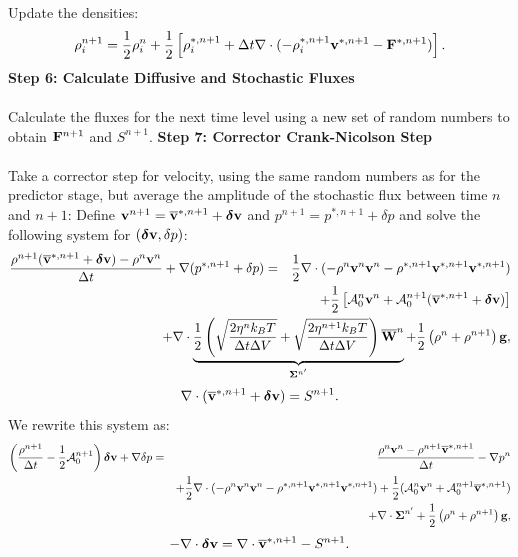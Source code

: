 \documentclass[final]{siamltex}
\def\Fb {{\bf F}}
\def\gb {{\bf g}}
\def\vb {{\bf v}}
\def\Wb {{\bf W}}
\def\deltab {\boldsymbol{\delta}}
\def\Sigmab {\boldsymbol{\Sigma}}
\def\half   {\frac{1}{2}}
\begin{document}
Update the densities:
\begin{equation}
\rho_i^{n+1} = \half\rho_i^n + \half\left[\rho_i^{*,n+1} + \Delta t\nabla\cdot(-\rho_i^{*,n+1}\vb^{*,n+1} - \Fb^{*,n+1})\right].
\end{equation}
{\bf Step 6: Calculate Diffusive and Stochastic Fluxes}\\ \\
Calculate the fluxes for the next time level using a new set of random numbers to obtain $\Fb^{n+1}$ and $S^{n+1}$.
{\bf Step 7: Corrector Crank-Nicolson Step}\\ \\
Take a corrector step for velocity, using the same random numbers as for the predictor
stage, but average the amplitude of the stochastic flux between time $n$ and $n+1$:
Define $\vb^{n+1} = \overline\vb^{*,n+1} + \deltab\vb$ and $p^{n+1} = p^{*,n+1} + \delta p$ and
solve the following system for $(\deltab\vb,\delta p)$:
\begin{eqnarray}
\frac{\rho^{n+1}(\overline\vb^{*,n+1} + \deltab\vb) - \rho^n\vb^n}{\Delta t} + \nabla(p^{*,n+1}+\delta p) &=& \half\nabla\cdot(-\rho^n\vb^n\vb^n - \rho^{*,n+1}\vb^{*,n+1}\vb^{*,n+1})\nonumber\\
&&\hspace{-1.5in}+ \half\left[\mathcal{A}_0^n\vb^n + \mathcal{A}_0^{n+1}(\overline\vb^{*,n+1} + \deltab\vb)\right]\nonumber\\
&&\hspace{-1.5in}+ \nabla\cdot\underbrace{\half\left(\sqrt{\frac{2\eta^n k_B T}{\Delta t\Delta V}} + \sqrt{\frac{2\eta^{n+1} k_B T}{\Delta t\Delta V}}\right)\overline\Wb^n}_{\Sigmab^{n'}} + \half\left(\rho^n+\rho^{n+1}\right)\gb,
\end{eqnarray}
\begin{equation}
\nabla\cdot(\overline\vb^{*,n+1} + \deltab\vb) = S^{n+1}.
\end{equation}
We rewrite this system as:
\begin{eqnarray}
\left(\frac{\rho^{n+1}}{\Delta t} - \half\mathcal{A}_0^{n+1}\right)\deltab\vb + \nabla\delta p &=& \frac{\rho^n\vb^n-\rho^{n+1}\overline\vb^{*,n+1}}{\Delta t} -\nabla p^n\nonumber\\
&&+ \half\nabla\cdot(-\rho^n\vb^n\vb^n - \rho^{*,n+1}\vb^{*,n+1}\vb^{*,n+1}) + \half(\mathcal{A}_0^n\vb^n + \mathcal{A}_0^{n+1}\overline\vb^{*,n+1} )\nonumber\\
&&+ \nabla\cdot\Sigmab^{n'} + \half\left(\rho^n+\rho^{n+1}\right)\gb,
\end{eqnarray}
\begin{equation}
-\nabla\cdot\deltab\vb = \nabla\cdot\overline\vb^{*,n+1} - S^{n+1}.
\end{equation}
\end{document}
